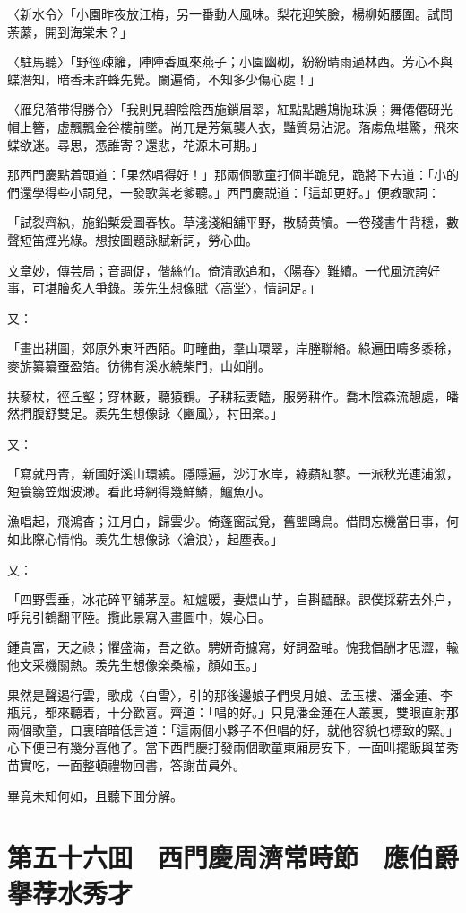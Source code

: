 〈新水令〉「小園昨夜放江梅，另一番動人風味。梨花迎笑臉，楊柳妬腰圍。試問荼䕷，開到海棠未？」

〈駐馬聽〉「野徑疎籬，陣陣香風來燕子；小園幽砌，紛紛晴雨過林西。芳心不與蝶潛知，暗香未許蜂先覺。闌遍倚，不知多少傷心處！」

〈雁兒落带得勝令〉「我則見碧陰陰西施鎖眉翠，紅點點鶗鴂抛珠淚；舞僊僊砑光帽上簪，虚飄飄金谷樓前墜。尚兀是芳氣襲人衣，豔質易沾泥。落䖏魚堪驚，飛來蝶欲迷。尋思，憑誰寄？還悲，花源未可期。」

那西門慶點着頭道：「果然唱得好！」那兩個歌童打個半跪兒，跪將下去道：「小的們還學得些小詞兒，一發歌與老爹聽。」西門慶説道：「這却更好。」便教歌詞：

「試裂齊紈，施鉛槧爰圖春牧。草淺淺細舖平野，散騎黄犢。一卷殘書牛背穩，數聲短笛煙光綠。想按圖題詠賦新詞，勞心曲。

文章妙，傳芸局；音調促，偕絲竹。倚清歌追和，〈陽春〉難續。一代風流誇好事，可堪膾炙人爭錄。羡先生想像賦〈高堂〉，情詞足。」

又：

「畫出耕圖，郊原外東阡西陌。町疃曲，羣山環翠，岸塍聯絡。綠遍田疇多黍稌，麥旂纂纂蚕盈箔。彷彿有溪水繞柴門，山如削。

扶藜杖，徑丘壑；穿林藪，聽猿鶴。子耕耘妻饁，服勞耕作。喬木陰森流憩處，皤然捫腹舒雙足。羨先生想像詠〈豳風〉，村田楽。」

又：

「寫就丹青，新圖好溪山環繞。隱隱遍，沙汀水岸，綠蘋紅蓼。一派秋光連浦溆，短簑篛笠烟波渺。看此時網得幾鮮鱗，鱸魚小。

漁唱起，飛鴻杳；江月白，歸雲少。倚蓬窗試覓，舊盟鷗鳥。借問忘機當日事，何如此際心情悄。羡先生想像詠〈滄浪〉，起塵表。」

又：

「四野雲垂，冰花碎平舖茅屋。紅爐暖，妻煨山芋，自斟醽醁。課僕採薪去外户，呼兒引鶴翻平陸。攬此景寫入畫圖中，娱心目。

鍾貴富，天之祿；懼盛滿，吾之欲。騁姸奇攄寫，好詞盈軸。愧我倡酬才思澀，輸他文采機關熱。羡先生想像楽桑楡，顏如玉。」

果然是聲遏行雲，歌成〈白雪〉，引的那後邊娘子們吳月娘、孟玉樓、潘金蓮、李瓶兒，都來聽着，十分歡喜。齊道：「唱的好。」只見潘金蓮在人叢裏，雙眼直射那兩個歌童，口裏暗暗低言道：「這兩個小夥子不但唱的好，就他容貌也標致的緊。」心下便已有幾分喜他了。當下西門慶打發兩個歌童東廂房安下，一面叫擺飯與苗秀苗實吃，一面整頓禮物回書，答謝苗員外。

畢竟未知何如，且聽下囬分解。

\chapter*{第五十六囬　西門慶周濟常時節　應伯爵擧荐水秀才}

